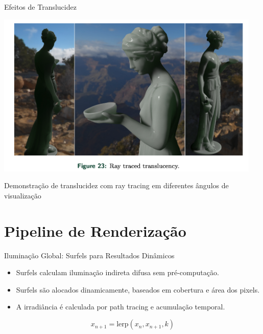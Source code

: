 \documentclass[aspectratio=169,xcolor=table]{beamer}
\begin{document}
\begin{frame}{Efeitos de Translucidez}
    \begin{center}
        \includegraphics[width=0.95\textwidth]{ray-traced-translucency}
    \end{center}
    \begin{center}
        \small{Demonstração de translucidez com ray tracing em diferentes ângulos de visualização}
    \end{center}
\end{frame}

\section{Pipeline de Renderização}
\begin{frame}{Iluminação Global: Surfels para Resultados Dinâmicos}
    \begin{itemize}
        \item Surfels calculam iluminação indireta difusa sem pré-computação.
        \item Surfels são alocados dinamicamente, baseados em cobertura e área dos pixels.
        \item A irradiância é calculada por path tracing e acumulação temporal.
    \end{itemize}
    \begin{equation*}
        x_{n+1} = \text{lerp}(x_n, x_{n+1}, k)
    \end{equation*}
\end{frame}
\end{document}
